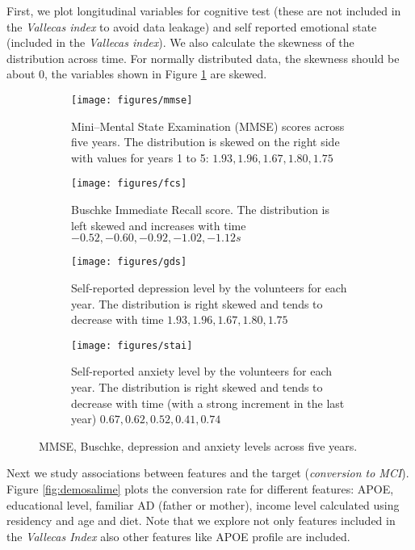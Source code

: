 \documentclass[11pt]{article}
\theoremstyle{definition}
\theoremstyle{remark}
\begin{document}
First, we plot longitudinal variables for cognitive test (these are not included in the \emph{Vallecas index} to avoid data leakage) and self reported emotional state (included in the \emph{Vallecas index}). We also calculate the skewness of the distribution across time. For normally distributed data, the skewness should be about 0, the variables shown in Figure \ref{fig:staigds} are skewed. 

\begin{figure}[H]
    \centering
    \begin{subfigure}[t]{\textwidth}
        \centering
        \texttt{[image: figures/mmse]}
        \caption{Mini–Mental State Examination (MMSE) scores across five years. The distribution is skewed on the right side with values for years 1 to 5: $1.93, 1.96, 1.67, 1.80, 1.75$}
    \end{subfigure}
    
    \begin{subfigure}[t]{\textwidth}
        \centering
        \texttt{[image: figures/fcs]}
        \caption{Buschke Immediate Recall score. The distribution is left skewed and increases with time $-0.52, -0.60, -0.92, -1.02, -1.12s$ }
    \end{subfigure}%
    
     \begin{subfigure}[t]{\textwidth}
        \centering
        \texttt{[image: figures/gds]}
        \caption{Self-reported depression level by the volunteers for each year. The distribution is right skewed and tends to decrease with time $1.93, 1.96, 1.67, 1.80, 1.75$ }
    \end{subfigure}
    
    \begin{subfigure}[t]{\textwidth}
        \centering
        \texttt{[image: figures/stai]}
        \caption{Self-reported anxiety level by the volunteers for each year. The distribution is right skewed and tends to decrease with time (with a strong increment in the last year) $0.67, 0.62, 0.52, 0.41, 0.74$}
    \end{subfigure}%
    \caption{MMSE, Buschke, depression and anxiety levels across five years.} \label{fig:staigds}
\end{figure}

Next we study associations between features and the target (\emph{conversion to MCI}). 
Figure \ref{fig:demosalime} plots the conversion rate for different features: APOE, educational level, familiar AD (father or mother), income level calculated using residency and age and diet. Note that we explore not only features included in the \emph{Vallecas Index} also other features like APOE profile are included. 
\end{document}
